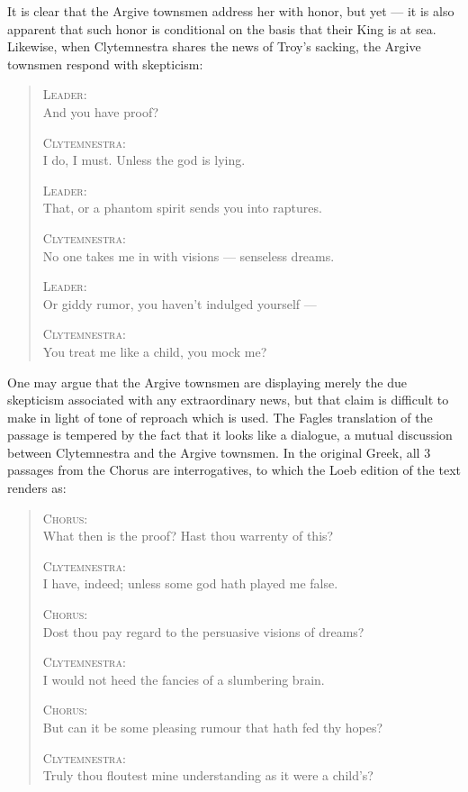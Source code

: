 \noindent
It is clear that the Argive townsmen address her with honor, but yet --- it is
also apparent that such honor is conditional on the basis that their King is
at sea. Likewise, when Clytemnestra shares the news of Troy's sacking, the
Argive townsmen respond with skepticism:

\begin{quote}
  \textsc{Leader}: \\
  And you have proof?

  \textsc{Clytemnestra}: \\
  I do, I must. Unless the god is lying.

  \textsc{Leader}: \\
  That, or a phantom spirit sends you into raptures.

  \textsc{Clytemnestra}: \\
  No one takes me in with visions --- senseless dreams.

  \textsc{Leader}: \\
  Or giddy rumor, you haven't indulged yourself ---

  \textsc{Clytemnestra}: \\
  You treat me like a child, you mock me?

  \autocite[275]{fagles}
\end{quote}

\noindent
One may argue that the Argive townsmen are displaying merely the due skepticism
associated with any extraordinary news, but that claim is difficult to make in
light of tone of reproach which is used. The Fagles translation of the passage
is tempered by the fact that it looks like a dialogue, a mutual discussion
between Clytemnestra and the Argive townsmen. In the original Greek, all 3
passages from the Chorus are interrogatives, to which the Loeb edition of the
text renders as:

\begin{quote}
  \textsc{Chorus}: \\
  What then is the proof? Hast thou warrenty of this?

  \textsc{Clytemnestra}: \\
  I have, indeed; unless some god hath played me false.

  \textsc{Chorus}: \\
  Dost thou pay regard to the persuasive visions of dreams?

  \textsc{Clytemnestra}: \\
  I would not heed the fancies of a slumbering brain.

  \textsc{Chorus}: \\
  But can it be some pleasing rumour that hath fed thy hopes?

  \textsc{Clytemnestra}: \\
  Truly thou floutest mine understanding as it were a child's?

  \autocite[275]{loeb}
\end{quote}

